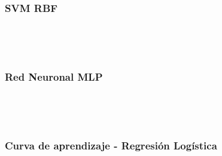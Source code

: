 \documentclass[11pt]{article}
\begin{document}
    \begin{center}
    \end{center}
    { \hspace*{\fill} \\}
    
    \subsubsection{SVM RBF}\label{svm-rbf}

    
    \begin{center}
    \end{center}
    { \hspace*{\fill} \\}
    
    \begin{center}
    \end{center}
    { \hspace*{\fill} \\}
    
    \subsubsection{Red Neuronal MLP}\label{red-neuronal-mlp}

    
    \begin{center}
    \end{center}
    { \hspace*{\fill} \\}
    
    \begin{center}
    \end{center}
    { \hspace*{\fill} \\}
    
    \subsubsection{Curva de aprendizaje - Regresión
Logística}\label{curva-de-aprendizaje---regresiuxf3n-loguxedstica}
\end{document}
